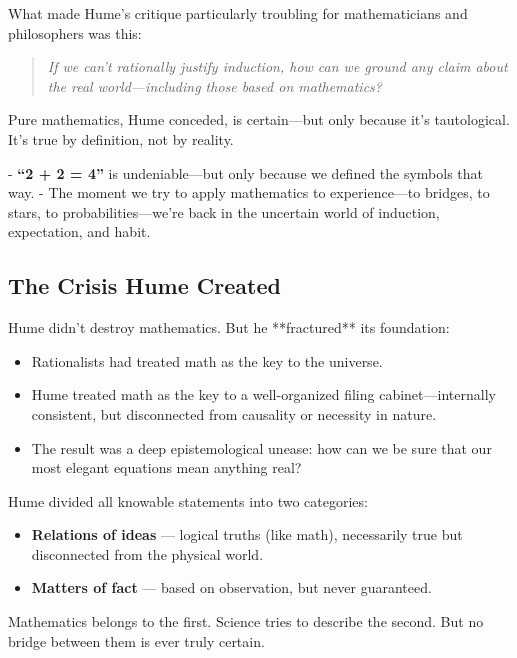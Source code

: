 What made Hume's critique particularly troubling for mathematicians and philosophers was this:  

\begin{quote}
\textit{If we can't rationally justify induction, how can we ground any claim about the real world—including those based on mathematics?}
\end{quote}

Pure mathematics, Hume conceded, is certain—but only because it's tautological. It's true by definition, not by reality.

- \textbf{“2 + 2 = 4”} is undeniable—but only because we defined the symbols that way.
- The moment we try to apply mathematics to experience—to bridges, to stars, to probabilities—we’re back in the uncertain world of induction, expectation, and habit.

\subsection*{The Crisis Hume Created}

Hume didn’t destroy mathematics. But he **fractured** its foundation:

\begin{itemize}
    \item Rationalists had treated math as the key to the universe.
    \item Hume treated math as the key to a well-organized filing cabinet—internally consistent, but disconnected from causality or necessity in nature.
    \item The result was a deep epistemological unease: how can we be sure that our most elegant equations mean anything real?
\end{itemize}

\begin{tcolorbox}[colback=gray!5!white, colframe=black!75!white, title={Hume’s Fork: The Two Kinds of Knowledge}]
Hume divided all knowable statements into two categories:

\begin{itemize}
    \item \textbf{Relations of ideas} — logical truths (like math), necessarily true but disconnected from the physical world.
    \item \textbf{Matters of fact} — based on observation, but never guaranteed.
\end{itemize}

Mathematics belongs to the first.  
Science tries to describe the second.  
But no bridge between them is ever truly certain.
\end{tcolorbox}

